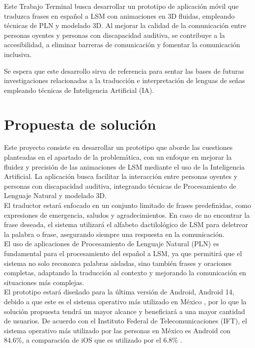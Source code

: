 Este Trabajo Terminal busca desarrollar un prototipo de aplicación móvil que traduzca frases en español a LSM con animaciones en 3D fluidas, empleando técnicas de PLN y modelado 3D. Al mejorar la calidad de la comunicación entre personas oyentes y personas con discapacidad auditiva, se contribuye a la accesibilidad, a eliminar barreras de comunicación y fomentar la comunicación inclusiva.\\

\newpage

Se espera que este desarrollo sirva de referencia para sentar las bases de futuras investigaciones relacionadas a la traducción e interpretación de lenguas de señas empleando técnicas de Inteligencia Artificial (IA).\\

\section{Propuesta de solución}
Este proyecto consiste en desarrollar un prototipo que aborde las cuestiones planteadas en el apartado de la problemática, con un enfoque en mejorar la fluidez y precisión de las animaciones de LSM mediante el uso de la Inteligencia Artificial. La aplicación busca facilitar la interacción entre personas oyentes y personas con discapacidad auditiva, integrando técnicas de Procesamiento de Lenguaje Natural y modelado 3D.\\

El traductor estará enfocado en un conjunto limitado de frases predefinidas, como expresiones de emergencia, saludos y agradecimientos. En caso de no encontrar la frase deseada, el sistema utilizará el alfabeto dactilológico de LSM para deletrear la palabra o frase, asegurando siempre una respuesta en la comunicación.\\

El uso de aplicaciones de Procesamiento de Lenguaje Natural (PLN) es fundamental para el procesamiento del español a LSM, ya que permitirá que el sistema no solo reconozca palabras aisladas, sino también frases y oraciones completas, adaptando la traducción al contexto y mejorando la comunicación en situaciones más complejas.\\

El prototipo estará diseñado para la última versión de Android, Android 14, debido a que este es el sistema operativo más utilizado en México \cite{ref5}, por lo que la solución propuesta tendrá un mayor alcance y beneficiará a una mayor cantidad de usuarios. De acuerdo con el Instituto Federal de Telecomunicaciones (IFT), el sistema operativo más utilizado por las personas en México es Android con 84.6\%, a comparación de iOS que es utilizado por el 6.8\% \cite{ref6}.\\

